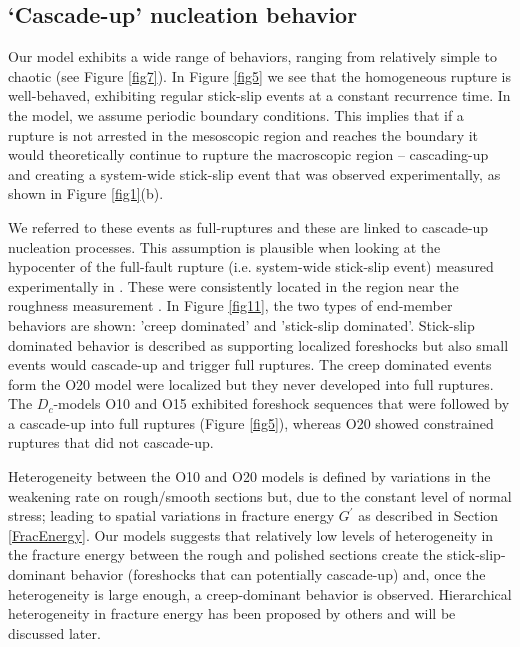 \documentclass[preprint,1p, 10pt,authoryear]{elsarticle}
\begin{document}
\subsection{`Cascade-up' nucleation behavior}
\label{Cascade_UP}
Our model exhibits a wide range of behaviors, ranging from relatively simple to chaotic (see Figure \ref{fig7}). In Figure \ref{fig5} we see that the homogeneous rupture is well-behaved, exhibiting regular stick-slip events at a constant recurrence time.  In the model, we assume periodic boundary conditions. This implies that if a rupture is not arrested in the mesoscopic region and reaches the boundary it would theoretically continue to rupture the macroscopic region -- cascading-up and creating a system-wide stick-slip event that was observed experimentally, as shown in Figure \ref{fig1}(b). 

We referred to these events as full-ruptures and these are linked to cascade-up nucleation processes. This assumption is plausible when looking at the hypocenter of the full-fault rupture (i.e. system-wide stick-slip event) measured experimentally in \citet{Selvadurai2015}. These were consistently located in the region near the roughness measurement \citep[magenta star in Fig. 7 and 8 in ][]{Selvadurai2015}. In Figure \ref{fig11}, the two types of end-member behaviors are shown: 'creep dominated' and 'stick-slip dominated'. Stick-slip dominated behavior is described as supporting localized foreshocks but also small events would cascade-up and trigger full ruptures. The creep dominated events form the O20 model were localized but they never developed into full ruptures. The $D_{c}$-models O10 and O15 exhibited foreshock sequences that were followed by a cascade-up into full ruptures (Figure \ref{fig5}), whereas O20 showed constrained ruptures that did not cascade-up. 

Heterogeneity between the O10 and O20 models is defined by variations in the weakening rate on rough/smooth sections but, due to the constant level of normal stress; leading to spatial variations in fracture energy $G^{'}$ as described in Section \ref{FracEnergy}. Our models suggests that relatively low levels of heterogeneity in the fracture energy between the rough and polished sections create the stick-slip-dominant behavior (foreshocks that can potentially cascade-up) and, once the heterogeneity is large enough, a creep-dominant behavior is observed. Hierarchical heterogeneity in fracture energy has been proposed by others \citep{Ide2005, Aochi2014, Aochi2017} and will be discussed later.
\end{document}
